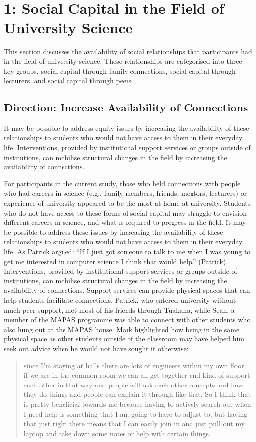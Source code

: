 \section{1: Social Capital in the Field of University Science}
This section discusses the availability of social relationships that participants had in the field of university science. These relationships are categorised into three key groups, social capital through family connections, social capital through lecturers, and social capital through peers. 

\subsection{Direction: Increase Availability of Connections}
It may be possible to address equity issues by increasing the availability of these relationships to students who would not have access to them in their everyday life. Interventions, provided by institutional support services or groups outside of institutions, can mobilise structural changes in the field by increasing the availability of connections. 




For participants in the current study, those who held connections with people who had careers in science (e.g., family members, friends, mentors, lecturers) or experience of university appeared to be the most at home at university. Students who do not have access to these forms of social capital may struggle to envision different careers in science, and what is required to progress in the field. It may be possible to address these issues by increasing the availability of these relationships to students who would not have access to them in their everyday life. As Patrick argued: ``If I just got someone to talk to me when I was young to get me interested in computer science I think that would help.'' (Patrick). Interventions, provided by institutional support services or groups outside of institutions, can mobilise structural changes in the field by increasing the availability of connections. Support services can provide physical spaces that can help students facilitate connections. Patrick, who entered university without much peer support, met most of his friends through Tuakana, while Sean, a member of the MAPAS programme was able to connect with other students who also hung out at the MAPAS house. Mark highlighted how being in the same physical space as other students outside of the classroom may have helped him seek out advice when he would not have sought it otherwise: \blockquote{since I’m staying at halls there are lots of engineers within my own floor... if we are in the common room we can all get together and kind of support each other in that way and people will ask each other concepts and how they do things and people can explain it through like that. So I think that is pretty beneficial towards me because having to actively search out when I need help is something that I am going to have to adjust to, but having that just right there means that I can easily join in and just pull out my laptop and take down some notes or help with certain things.}


